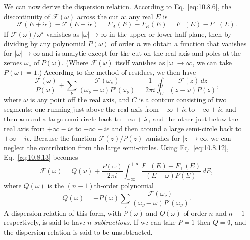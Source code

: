 We can now derive the dispersion relation. According to
Eq.~\eqref{eq:10.8.6}, the discontinuity of $\mathcal F(\omega)$ across the
cut at any real $E$ is
\begin{equation}
  \mathcal F(E+i\epsilon)-\mathcal F(E-i\epsilon)
  =F_A(E)-F_R(E)=F_-(E)-F_+(E).
  \tag{10.8.12}\label{eq:10.8.12}
\end{equation}
If $\mathcal F(\omega)/\omega^n$ vanishes as $|\omega|\to\infty$ in the
upper or lower half-plane, then by dividing by any polynomial $P(\omega)$
of order $n$ we obtain a function that vanishes for $|\omega|\to\infty$
and is analytic except for the cut on the real axis and poles at the zeroes
$\omega_\nu$ of $P(\omega)$. (Where $\mathcal F(\omega)$ itself vanishes
as $|\omega|\to\infty$, we can take $P(\omega)=1$.) According to the
method of residues, we then have
\begin{equation}
  \frac{\mathcal F(\omega)}{P(\omega)}
  +\sum_\nu\frac{\mathcal F(\omega_\nu)}
  {(\omega_\nu-\omega)P'(\omega_\nu)}
  =\frac{1}{2\pi i}\oint_C
  \frac{\mathcal F(z)\,dz}{(z-\omega)P(z)},
  \tag{10.8.13}\label{eq:10.8.13}
\end{equation}
where $\omega$ is any point off the real axis, and $C$ is a contour consisting
of two segments: one running just above the real axis from $-\infty+i\epsilon$
to $+\infty+i\epsilon$ and then around a large semi-circle back to
$-\infty+i\epsilon$, and the other just below the real axis from
$+\infty-i\epsilon$ to $-\infty-i\epsilon$ and then around a large
semi-circle back to $+\infty-i\epsilon$. Because the function
$\mathcal F(z)/P(z)$ vanishes for $|z|\to\infty$, we can neglect the
contribution from the large semi-circles. Using Eq.~\eqref{eq:10.8.12},
Eq.~\eqref{eq:10.8.13} becomes
\begin{equation}
  \mathcal F(\omega)=Q(\omega)+\frac{P(\omega)}{2\pi i}
  \int_{-\infty}^{+\infty}
  \frac{F_-(E)-F_+(E)}{(E-\omega)P(E)}\,dE,
  \tag{10.8.14}\label{eq:10.8.14}
\end{equation}
where $Q(\omega)$ is the $(n-1)$th-order polynomial
\begin{equation*}
  Q(\omega)=-P(\omega)\sum_\nu
  \frac{\mathcal F(\omega_\nu)}
  {(\omega_\nu-\omega)P'(\omega_\nu)}.
\end{equation*}
A dispersion relation of this form, with $P(\omega)$ and $Q(\omega)$ of
order $n$ and $n-1$ respectively, is said to have $n$ \emph{subtractions}.
If we can take $P=1$ then $Q=0$, and the dispersion relation is said to be
unsubtracted.

